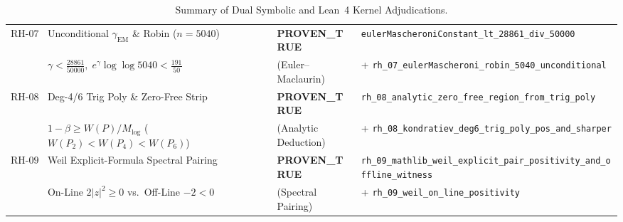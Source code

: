 \documentclass[11pt,a4paper]{article}
\theoremstyle{plain}
\theoremstyle{definition}
\theoremstyle{remark}
\begin{document}
\begin{table}[htbp]
\begin{tabular}{@{}llll@{}}
$\mathrm{RH\text{-}07}$ & Unconditional $\gamma_{\mathrm{EM}}$ \& Robin ($n=5040$) & \textbf{PROVEN\_TRUE} & \texttt{eulerMascheroniConstant\_lt\_28861\_div\_50000} \\
                        & $\gamma < \frac{28861}{50000},\; e^{\gamma}\log\log 5040 < \frac{191}{50}$ & (Euler--Maclaurin) & + \texttt{rh\_07\_eulerMascheroni\_robin\_5040\_unconditional} \\
$\mathrm{RH\text{-}08}$ & Deg-4/6 Trig Poly \& Zero-Free Strip & \textbf{PROVEN\_TRUE} & \texttt{rh\_08\_analytic\_zero\_free\_region\_from\_trig\_poly} \\
                        & $1-\beta \ge W(P)/M_{\log}$ ($W(P_2)<W(P_4)<W(P_6)$) & (Analytic Deduction) & + \texttt{rh\_08\_kondratiev\_deg6\_trig\_poly\_pos\_and\_sharper} \\
$\mathrm{RH\text{-}09}$ & Weil Explicit-Formula Spectral Pairing & \textbf{PROVEN\_TRUE} & \texttt{rh\_09\_mathlib\_weil\_explicit\_pair\_positivity\_and\_offline\_witness} \\
                        & On-Line $2|z|^2\ge 0$ vs.\ Off-Line $-2<0$ & (Spectral Pairing) & + \texttt{rh\_09\_weil\_on\_line\_positivity} \\
\bottomrule
\end{tabular}
\caption{Summary of Dual Symbolic and Lean~4 Kernel Adjudications.}
\label{tab:g3-summary}
\end{table}
\end{document}
